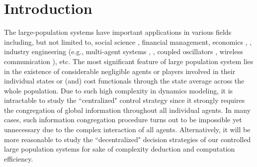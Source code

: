 \documentclass[11pt]{article}
\begin{document}




\section{Introduction}\label{sec:intro}

The large-population systems have
important applications in various fields including, but not limited
to, social science \cite{H-C-M 2009}, financial management, economics \cite{L 1984}, \cite{W-B-V 2005}, industry engineering (e.g., multi-agent systems
\cite{L-Z 2008}, \cite{W-Z 2012}, coupled oscillators
\cite{Y-M-M-S 2012}, wireless communication \cite{H-C-M 2004}), etc.
The most significant feature of large population system lies in the existence of considerable negligible agents or players involved in their individual states or (and) cost functionals through the state average across the whole population. Due to such high complexity in dynamics modeling, it is intractable to study the ``centralized" control strategy since it strongly requires the congregation of global information throughout all individual agents. In many cases, such information congregation procedure turns out to be impossible yet unnecessary due to the complex interaction of all agents. Alternatively, it will be more reasonable to study the ``decentralized" decision strategies of our controlled large population systems for sake of complexity deduction and computation efficiency.
\end{document}

